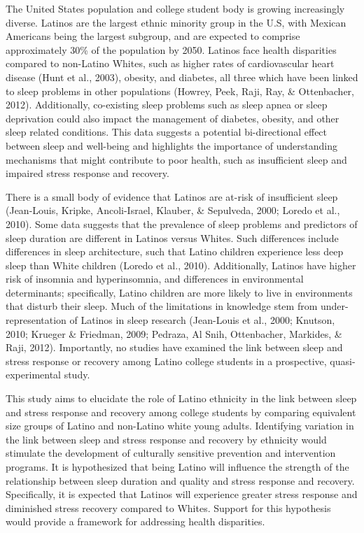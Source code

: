 \documentclass[
  man, fleqn, noextraspace]{apa6}
\begin{document}
The United States population and college student body is growing increasingly diverse. Latinos are the largest ethnic minority group in the U.S, with Mexican Americans being the largest subgroup, and are expected to comprise approximately 30\% of the population by 2050. Latinos face health disparities compared to non-Latino Whites, such as higher rates of cardiovascular heart disease (Hunt et al., 2003), obesity, and diabetes, all three which have been linked to sleep problems in other populations (Howrey, Peek, Raji, Ray, \& Ottenbacher, 2012). Additionally, co-existing sleep problems such as sleep apnea or sleep deprivation could also impact the management of diabetes, obesity, and other sleep related conditions. This data suggests a potential bi-directional effect between sleep and well-being and highlights the importance of understanding mechanisms that might contribute to poor health, such as insufficient sleep and impaired stress response and recovery.

There is a small body of evidence that Latinos are at-risk of insufficient sleep (Jean-Louis, Kripke, Ancoli-Israel, Klauber, \& Sepulveda, 2000; Loredo et al., 2010). Some data suggests that the prevalence of sleep problems and predictors of sleep duration are different in Latinos versus Whites. Such differences include differences in sleep architecture, such that Latino children experience less deep sleep than White children (Loredo et al., 2010). Additionally, Latinos have higher risk of insomnia and hyperinsomnia, and differences in environmental determinants; specifically, Latino children are more likely to live in environments that disturb their sleep. Much of the limitations in knowledge stem from under-representation of Latinos in sleep research (Jean-Louis et al., 2000; Knutson, 2010; Krueger \& Friedman, 2009; Pedraza, Al Snih, Ottenbacher, Markides, \& Raji, 2012). Importantly, no studies have examined the link between sleep and stress response or recovery among Latino college students in a prospective, quasi-experimental study.

This study aims to elucidate the role of Latino ethnicity in the link between sleep and stress response and recovery among college students by comparing equivalent size groups of Latino and non-Latino white young adults. Identifying variation in the link between sleep and stress response and recovery by ethnicity would stimulate the development of culturally sensitive prevention and intervention programs. It is hypothesized that being Latino will influence the strength of the relationship between sleep duration and quality and stress response and recovery. Specifically, it is expected that Latinos will experience greater stress response and diminished stress recovery compared to Whites. Support for this hypothesis would provide a framework for addressing health disparities.
\end{document}
